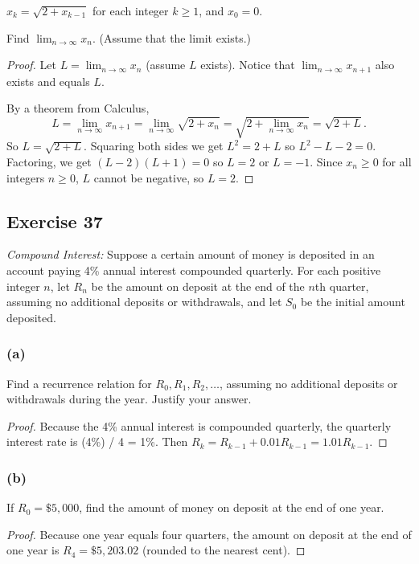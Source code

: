 \documentclass[14pt]{extarticle}
\newcommand{\dps}{\displaystyle}
\begin{document}
\(\dps x_k = \sqrt{2 + x_{k-1}}\) for each integer \(k \geq 1\), and \(x_0 = 0\).

Find \(\dps \lim_{n\to\infty} x_n\). (Assume that the limit exists.)

\begin{proof}
    Let \(\dps L = \lim_{n\to\infty} x_n\) (assume $L$ exists). Notice that \(\dps \lim_{n\to\infty} x_{n+1}\) also exists
    and equals $L$.

    By a theorem from Calculus,
    \[
        L = \lim_{n\to\infty} x_{n+1} = \lim_{n\to\infty} \sqrt{2 + x_n} = \sqrt{2 + \lim_{n\to\infty} x_n} = \sqrt{2+L}.
    \]
    So \(L = \sqrt{2 + L}\). Squaring both sides we get \(L^2 = 2 + L\) so \(L^2 - L - 2 = 0\). Factoring, we get
    \((L-2)(L+1) = 0\) so $L = 2$ or $L = -1$. Since $x_n \geq 0$ for all integers $n \geq 0$, $L$ cannot be negative, so
    $L = 2$.
\end{proof}

\subsection{Exercise 37}
{\it Compound Interest:} Suppose a certain amount of money is deposited in an account paying 4\% annual interest compounded quarterly. For each positive integer $n$, let $R_n$ be the amount on deposit at the end of the $n$th quarter, assuming no additional deposits or withdrawals, and let $S_0$ be the initial amount deposited.

\subsubsection{(a)}
Find a recurrence relation for $R_0, R_1, R_2, \ldots$, assuming no additional deposits or withdrawals during the
year. Justify your answer.

\begin{proof}
    Because the 4\% annual interest is compounded quarterly, the quarterly interest rate is (4\%) / 4 = 1\%. Then
    \(R_k = R_{k-1} + 0.01R_{k - 1} = 1.01R_{k-1}.\)
\end{proof}

\subsubsection{(b)}
If $R_0 = \$5,000$, find the amount of money on deposit at the end of one year.

    \begin{proof}
        Because one year equals four quarters, the amount on deposit at the end of one year is \(R_4 = \$5,203.02\)
        (rounded to the nearest cent).
    \end{proof}
\end{document}
